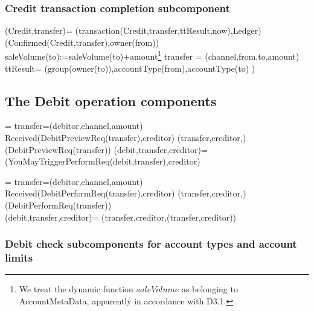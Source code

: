  \subsubsection{Credit transaction completion subcomponent}
 \begin{asm}
 (Credit,transfer)=\+   
 (transaction(Credit,transfer,ttResult,now),Ledger)\\
 (Confirmed(Credit,transfer),\TO owner(from))\\
 saleVolume(to):=saleVolume(to)+amount\footnote{We treat the dynamic function $saleVolume$ as belonging to AccountMetaData, apparently in accordance with D3.1.} \-
 \WHERE \+
 transfer = (channel,from,to,amount)\\
 ttResult= (group(owner(to)),accountType(from),accountType(to) )
 \end{asm}
 
 \subsection{The Debit operation components}
 

\begin{asm}
  =\+
\LET  transfer=(debitor,channel,amount)\+
  \IF Received(DebitPreviewReq(transfer),\FROM creditor) \THEN \+   
    (transfer,creditor,)\\
    (DebitPreviewReq(transfer)) \-
  \WHERE \+
     (debit,transfer,creditor)=\+
        (YouMayTriggerPerformReq(debit,transfer),\TO  creditor)
\end{asm}
 

 
 \begin{asm}
  =\+
 \LET  transfer=(debitor,channel,amount)\+
    \IF Received(DebitPerformReq(transfer),\FROM creditor) \THEN \+  
       (transfer,creditor,)\\
       (DebitPerformReq(transfer))\-
    \WHERE \\
 (debit,transfer,creditor)=\+
 (transfer,creditor,(transfer,creditor))
 \end{asm}
 
 \subsubsection{Debit check subcomponents for account types and account limits}
 
